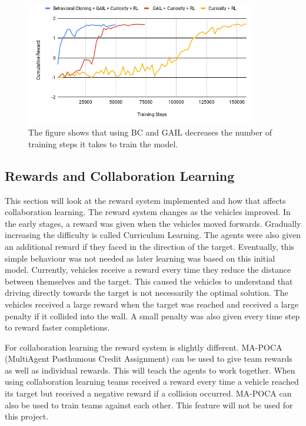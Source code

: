 \begin{figure}[h]
    \centering
    \includegraphics[width=0.9\textwidth]{06_Implementation/00_MLAgents/Images/mlagents-ImitationAndRL.png}
    \caption[Imitation and RL]{The figure shows that using BC and GAIL decreases the number of training steps it takes to train the model.} \label{06:bc}
\end{figure}


\subsection{Rewards and Collaboration Learning} \label{reward}
This section will look at the reward system implemented and how that affects collaboration learning. The reward system changes as the vehicles improved. In the early stages, a reward was given when the vehicles moved forwards. Gradually increasing the difficulty is called Curriculum Learning. The agents were also given an additional reward if they faced in the direction of the target. Eventually, this simple behaviour was not needed as later learning was based on this initial model. Currently, vehicles receive a reward every time they reduce the distance between themselves and the target. This caused the vehicles to understand that driving directly towards the target is not necessarily the optimal solution. The vehicles received a large reward when the target was reached and received a large penalty if it collided into the wall. A small penalty was also given every time step to reward faster completions.

For collaboration learning the reward system is slightly different. MA-POCA (MultiAgent Posthumous Credit Assignment) can be used to give team rewards as well as individual rewards. This will teach the agents to work together. When using collaboration learning teams received a reward every time a vehicle reached its target but received a negative reward if a collision occurred. MA-POCA can also be used to train teams against each other. This feature will not be used for this project. 

